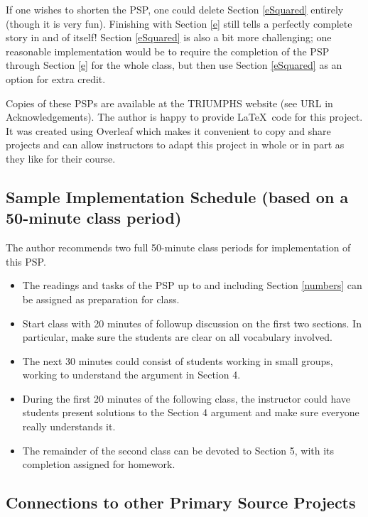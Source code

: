 \documentclass[11pt]{article}
\begin{document}
If one wishes to shorten the PSP, one could delete Section \ref{eSquared} entirely (though it is very fun).  Finishing with Section \ref{e} still tells a perfectly complete story in and of itself!  Section \ref{eSquared} is also a bit more challenging; one reasonable implementation would be to require the completion of the PSP through Section \ref{e} for the whole class, but then use Section \ref{eSquared} as an option for extra credit.    

 Copies of these PSPs are available at the TRIUMPHS website (see URL in Acknowledgements).  
The author is happy to provide \LaTeX\ code for this project.  It was created using Overleaf which makes it convenient to copy and share projects and can allow instructors to adapt this project in whole or in part as they like for their course.


\subsection*{Sample Implementation Schedule (based on a 50-minute class period)}

The author recommends two full 50-minute class periods for implementation of this PSP.
\begin{itemize}
    \item The readings and tasks of the PSP up to and including Section \ref{numbers} can be assigned as preparation for class.
    \item Start class with 20 minutes of followup discussion on the first two sections.  In particular, make sure the students are clear on all vocabulary involved.
    \item The next 30 minutes could consist of students working in small groups, working to understand the argument in Section 4. 
    \item During the first 20 minutes of the following class, the instructor could have students present solutions to the Section 4 argument and make sure everyone really understands it.  
    \item The remainder of the second class can be devoted to Section 5, with its completion assigned for homework.
\end{itemize}
 

 \vspace*{-3pt}
\subsection*{Connections to other Primary Source Projects}
\end{document}
